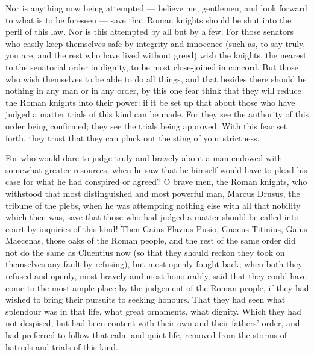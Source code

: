  Nor is anything now being attempted --- believe me, gentlemen, and look forward to what is to be foreseen --- save that Roman knights should be shut into the peril of this law. Nor is this attempted by all but by a few. For those senators who easily keep themselves safe by integrity and innocence (such as, to say truly, you are, and the rest who have lived without greed) wish the knights, the nearest to the senatorial order in dignity, to be most close-joined in concord. But those who wish themselves to be able to do all things, and that besides there should be nothing in any man or in any order, by this one fear think that they will reduce the Roman knights into their power: if it be set up that about those who have judged a matter trials of this kind can be made. For they see the authority of this order being confirmed; they see the trials being approved. With this fear set forth, they trust that they can pluck out the sting of your strictness.

 For who would dare to judge truly and bravely about a man endowed with somewhat greater resources, when he saw that he himself would have to plead his case for what he had conspired or agreed? O brave men, the Roman knights, who withstood that most distinguished and most powerful man, Marcus Drusus, the tribune of the plebs, when he was attempting nothing else with all that nobility which then was, save that those who had judged a matter should be called into court by inquiries of this kind! Then Gaius Flavius Pusio, Gnaeus Titinius, Gaius Maecenas, those oaks of the Roman people, and the rest of the same order did not do the same as Cluentius now (so that they should reckon they took on themselves any fault by refusing), but most openly fought back; when both they refused and openly, most bravely and most honourably, said that they could have come to the most ample place by the judgement of the Roman people, if they had wished to bring their pursuits to seeking honours. That they had seen what splendour was in that life, what great ornaments, what dignity. Which they had not despised, but had been content with their own and their fathers' order, and had preferred to follow that calm and quiet life, removed from the storms of hatreds and trials of this kind.


